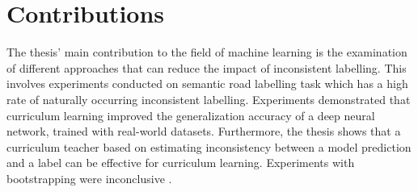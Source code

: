 \section{Contributions}
\label{sec:IntroContributions}
The thesis' main contribution to the field of machine learning  is the examination of different approaches that can reduce the impact of inconsistent labelling. This involves experiments conducted on semantic road labelling task which has a high rate of naturally occurring inconsistent labelling. Experiments demonstrated that curriculum learning improved the generalization accuracy of a deep neural network, trained with real-world datasets. Furthermore, the thesis shows that a curriculum teacher based on estimating inconsistency between a model prediction and a label can be effective for curriculum learning. Experiments with bootstrapping were inconclusive .
